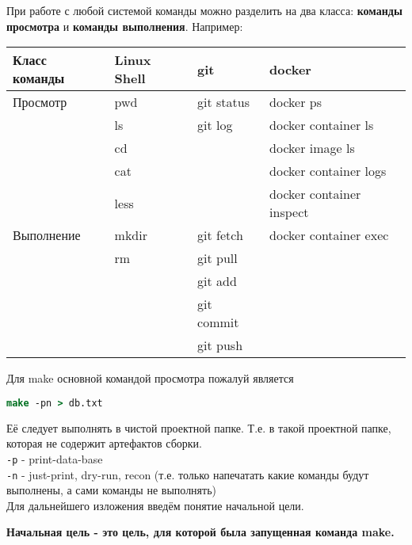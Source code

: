 При работе с любой системой команды можно разделить на два класса: \textbf{команды просмотра} и \textbf{команды выполнения}. Например:

{\ttfamily
\begin{tabular}{|l|l|l|l|}
  \hline
  \textbf{Класс команды} & \textbf{Linux Shell} & \textbf{git} & \textbf{docker} \\
  \hline
  Просмотр  & pwd   & git status  & docker ps                \\
            & ls    & git log     & docker container ls      \\
            & cd    &             & docker image ls          \\
            & cat   &             & docker container logs    \\
            & less  &             & docker container inspect \\
  \hline
  Выполнение & mkdir & git fetch   & docker container exec   \\
             & rm    & git pull    &                         \\
             &       & git add     &                         \\
             &       & git commit  &                         \\
             &       & git push    &                         \\
  \hline
\end{tabular}
} %

\vspace{20pt}

Для make основной командой просмотра пожалуй является

\begin{lstlisting}[language=csh]
make -pn > db.txt
\end{lstlisting}

Её следует выполнять в чистой проектной папке. Т.е. в такой проектной папке, которая не содержит артефактов сборки. \\
\texttt{-p} - print-data-base \\
\texttt{-n} - just-print, dry-run, recon (т.е. только напечатать какие команды будут выполнены, а сами команды не выполнять) \\

Для дальнейшего изложения введём понятие начальной цели.

{\bfseries
Начальная цель - это цель, для которой была запущенная команда make.
}

